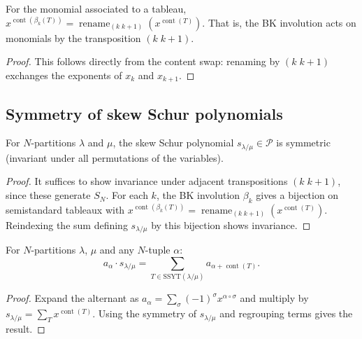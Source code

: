 \begin{lemma}
\label{lem.sf.bk-monomial}
\leanhelper
\leanok
For the monomial associated to a tableau,
$x^{\operatorname{cont}(\beta_k(T))} = \operatorname{rename}_{(k\;k{+}1)}(x^{\operatorname{cont}(T)})$.
That is, the BK involution acts on monomials by the transposition $(k\;k{+}1)$.
\end{lemma}

\begin{proof}
\leanok
This follows directly from the content swap: renaming by $(k\;k{+}1)$
exchanges the exponents of $x_k$ and $x_{k+1}$.
\end{proof}

\subsection{Symmetry of skew Schur polynomials}

\begin{lemma}
\label{thm.sf.skew-schur-symm-lr}
\leanhelper
\leanok
For $N$-partitions $\lambda$ and $\mu$, the skew Schur polynomial
$s_{\lambda/\mu} \in \mathcal{P}$ is symmetric (invariant under all
permutations of the variables).
\end{lemma}

\begin{proof}
\leanok
It suffices to show invariance under adjacent transpositions $(k\;k{+}1)$,
since these generate $S_N$.  For each $k$, the BK involution $\beta_k$ gives
a bijection on semistandard tableaux with
$x^{\operatorname{cont}(\beta_k(T))} = \operatorname{rename}_{(k\;k{+}1)}(x^{\operatorname{cont}(T)})$.
Reindexing the sum defining $s_{\lambda/\mu}$ by this bijection shows invariance.
\end{proof}

\begin{lemma}
\label{lem.sf.alternant-mul-skew-schur}
\leanhelper
\leanok
For $N$-partitions $\lambda$, $\mu$ and any $N$-tuple $\alpha$:
\[
  a_\alpha \cdot s_{\lambda/\mu}
  = \sum_{T \in \mathrm{SSYT}(\lambda/\mu)} a_{\alpha + \operatorname{cont}(T)}.
\]
\end{lemma}

\begin{proof}
\leanok
Expand the alternant as $a_\alpha = \sum_\sigma (-1)^\sigma x^{\alpha \circ \sigma}$
and multiply by $s_{\lambda/\mu} = \sum_T x^{\operatorname{cont}(T)}$. Using
the symmetry of $s_{\lambda/\mu}$ and regrouping terms gives the result.
\end{proof}

